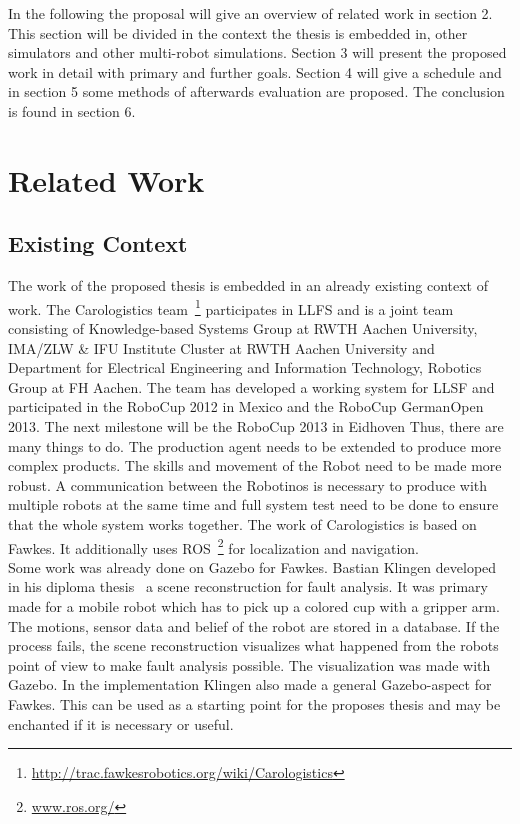 \documentclass[11pt,a4paper,titlepage]{article}
\begin{document}
In the following the proposal will give an overview of related work in section 2. This section will be divided in the context the thesis is embedded in, other simulators and other multi-robot simulations. Section 3 will present the proposed work in detail with primary and further goals. Section 4 will give a schedule and in section 5 some methods of afterwards evaluation are proposed. The conclusion is found in section 6.


\section{Related Work}
\subsection{Existing Context}
The work of the proposed thesis is embedded in an already existing context of work. The Carologistics team~\footnote{\url{http://trac.fawkesrobotics.org/wiki/Carologistics}} participates in LLFS and is a joint team consisting of Knowledge-based Systems Group at RWTH Aachen University, IMA/ZLW \& IFU Institute Cluster at RWTH Aachen University and Department for Electrical Engineering and Information Technology, Robotics Group at FH Aachen. The team has developed a working system for LLSF and participated in the RoboCup 2012 in Mexico and the RoboCup GermanOpen 2013. The next milestone will be the RoboCup 2013 in Eidhoven Thus, there are many things to do. The production agent needs to be extended to produce more complex products. The skills and movement of the Robot need to be made more robust. A communication between the Robotinos is necessary to produce with multiple robots at the same time and full system test need to be done to ensure that the whole system works together. The work of Carologistics is based on Fawkes. It additionally uses ROS~\footnote{\url{www.ros.org/}} for localization and navigation.\\
Some work was already done on Gazebo for Fawkes. Bastian Klingen developed in his diploma thesis~\cite{KlingenDA} a scene reconstruction for fault analysis. It was primary made for a mobile robot which has to pick up a colored cup with a gripper arm. The motions, sensor data and belief of the robot are stored in a database. If the process fails, the scene reconstruction visualizes what happened from the robots point of view to make fault analysis possible. The visualization was made with Gazebo. In the implementation Klingen also made a general Gazebo-aspect for Fawkes. This can be used as a starting point for the proposes thesis and may be enchanted if it is necessary or useful.
\end{document}
